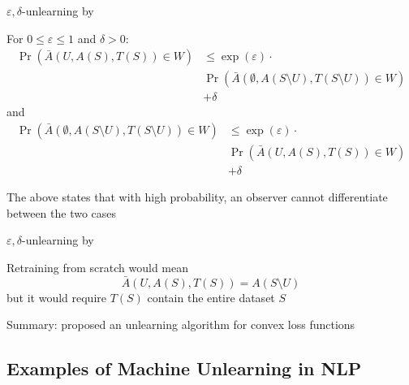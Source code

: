\documentclass[12pt,aspectratio=169,handout]{beamer}
\begin{document}
\begin{frame}{$\varepsilon, \delta$-unlearning by \citet{Sekhari.et.al.2021.NeurIPS}}

For $0 \leq \varepsilon \leq 1$ and $\delta > 0$:
$$
\begin{aligned}
\Pr(\bar{A}(U, A(S), T(S)) \in W) &\leq \exp(\varepsilon) \cdot \\
&\Pr(\bar{A}(\emptyset, A(S \setminus U), T(S \setminus U)) \in W) \\ 
&+ \delta
\end{aligned}
$$
and
$$
\begin{aligned}
\Pr(\bar{A}(\emptyset, A(S \setminus U), T(S \setminus U)) \in W) &\leq \exp(\varepsilon) \cdot \\
&\Pr(\bar{A}(U, A(S), T(S)) \in W) \\ 
&+ \delta
\end{aligned}
$$

The above states that with high probability, an observer cannot differentiate between the two cases


\end{frame}


\begin{frame}{$\varepsilon, \delta$-unlearning by \citet{Sekhari.et.al.2021.NeurIPS}}

Retraining from scratch would mean
$$
\bar{A}(U, A(S), T(S)) = A(S \setminus U)
$$
but it would require $T(S)$ contain the entire dataset $S$

\bigskip

Summary:
\citet{Sekhari.et.al.2021.NeurIPS} proposed an unlearning algorithm for convex loss functions


\end{frame}


\subsection{Examples of Machine Unlearning in NLP}
\end{document}
